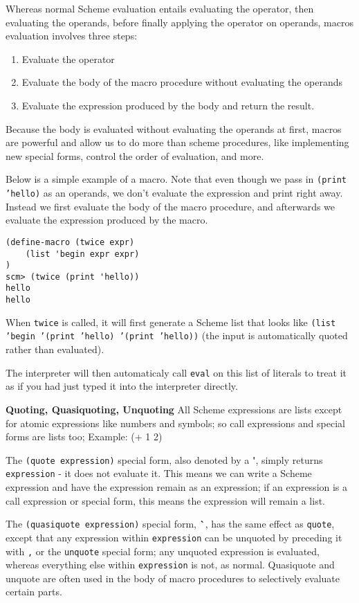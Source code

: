 Whereas normal Scheme evaluation entails evaluating the operator, then evaluating the operands, before finally applying the operator on operands, macros evaluation involves three steps:

\begin{enumerate}[1.]
\item Evaluate the operator
\item Evaluate the body of the macro procedure without evaluating the operands
\item Evaluate the expression produced by the body and return the result.
\end{enumerate}

Because the body is evaluated without evaluating the operands at first, macros are powerful and allow us to do more than scheme procedures, like implementing new special forms, control the order of evaluation, and more. 

Below is a simple example of a macro. Note that even though we pass in \texttt{(print 'hello)} as an operands, we don't evaluate the expression and print right away. Instead we first evaluate the body of the macro procedure, and afterwards we evaluate the expression produced by the macro. 
\begin{lstlisting}
(define-macro (twice expr)
    (list 'begin expr expr)
)
scm> (twice (print 'hello))
hello
hello
\end{lstlisting}

When \texttt{twice} is called, it will first generate a Scheme list that looks like \texttt{(list 'begin '(print 'hello) '(print 'hello))} (the input is automatically quoted rather than evaluated).

The interpreter will then automaticaly call \texttt{eval} on this list of literals to treat it as if you had just typed it into the interpreter directly. 

\newpage
\textbf{Quoting, Quasiquoting, Unquoting} All Scheme expressions are lists except for atomic expressions like numbers and symbols; so call expressions and special forms are lists too; Example: (+ 1 2)

The \texttt{(quote expression)} special form, also denoted by a \textbf{\'}, simply returns \texttt{expression} - it does not evaluate it. This means we can write a Scheme expression and have the expression remain as an expression; if an expression is a call expression or special form, this means the expression will remain a list. 

The \texttt{(quasiquote expression)} special form, \textbf{\`}, has the same effect as \texttt{quote}, except that any expression within \texttt{expression} can be unquoted by preceding it with \texttt{,} or the \texttt{unquote} special form; any unquoted expression is evaluated, whereas everything else within \texttt{expression} is not, as normal. Quasiquote and unquote are often used in the body of macro procedures to selectively evaluate certain parts. 

